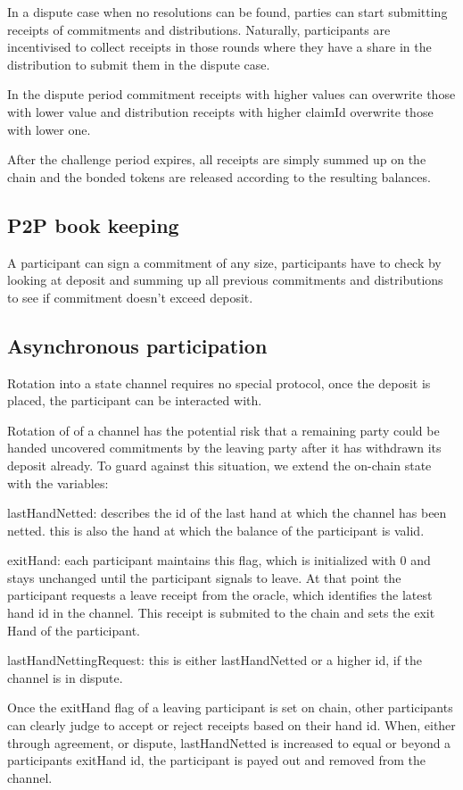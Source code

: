 In a dispute case when no resolutions can be found, parties can start submitting receipts of commitments and distributions. Naturally, participants are incentivised to collect receipts in those rounds where they have a share in the distribution to submit them in the dispute case.

In the dispute period commitment receipts with higher values can overwrite those with lower value and distribution receipts with higher claimId overwrite those with lower one.

After the challenge period expires, all receipts are simply summed up on the chain and the bonded tokens are released according to the resulting balances.

\subsection{P2P book keeping}

A participant can sign a commitment of any size, participants have to check by looking at deposit and summing up all previous commitments and distributions to see if commitment doesn't exceed deposit.

\subsection{Asynchronous participation}

Rotation into a state channel requires no special protocol, once the deposit is placed, the participant can be interacted with.

Rotation of of a channel has the potential risk that a remaining party could be handed uncovered commitments by the leaving party after it has withdrawn its deposit already. To guard against this situation, we extend the on-chain state with the variables:

lastHandNetted: describes the id of the last hand at which the channel has been netted. this is also the hand at which the balance of the participant is valid.

exitHand: each participant maintains this flag, which is initialized with 0 and stays unchanged until the participant signals to leave. At that point the participant requests a leave receipt from the oracle, which identifies the latest hand id in the channel. This receipt is submited to the chain and sets the exit Hand of the participant.

lastHandNettingRequest: this is either lastHandNetted or a higher id, if the channel is in dispute.

Once the exitHand flag of a leaving participant is set on chain, other participants can clearly judge to accept or reject receipts based on their hand id. When, either through agreement, or dispute, lastHandNetted is increased to equal or beyond a participants exitHand id, the participant is payed out and removed from the channel. 
